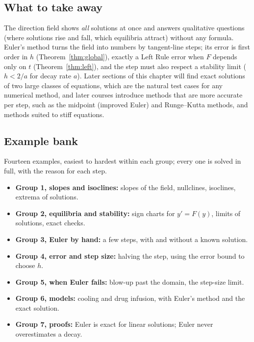 \documentclass[11pt]{article}
\begin{document}
\subsection*{What to take away}

The direction field shows \emph{all} solutions at once and answers qualitative questions (where solutions rise and fall, which equilibria attract) without any formula. Euler's method turns the field into numbers by tangent-line steps; its error is first order in $h$ (Theorem~\ref{thm:global}), exactly a Left Rule error when $F$ depends only on $t$ (Theorem~\ref{thm:left}), and the step must also respect a stability limit ($h<2/a$ for decay rate $a$). Later sections of this chapter will find exact solutions of two large classes of equations, which are the natural test cases for any numerical method, and later courses introduce methods that are more accurate per step, such as the midpoint (improved Euler) and Runge--Kutta methods, and methods suited to stiff equations.

\subsection*{Example bank}

\begin{remark}
Fourteen examples, easiest to hardest within each group; every one is solved in full, with the reason for each step.
\begin{itemize}[nosep]
  \item \textbf{Group 1, slopes and isoclines:} slopes of the field, nullclines, isoclines, extrema of solutions.
  \item \textbf{Group 2, equilibria and stability:} sign charts for $y'=F(y)$, limits of solutions, exact checks.
  \item \textbf{Group 3, Euler by hand:} a few steps, with and without a known solution.
  \item \textbf{Group 4, error and step size:} halving the step, using the error bound to choose $h$.
  \item \textbf{Group 5, when Euler fails:} blow-up past the domain, the step-size limit.
  \item \textbf{Group 6, models:} cooling and drug infusion, with Euler's method and the exact solution.
  \item \textbf{Group 7, proofs:} Euler is exact for linear solutions; Euler never overestimates a decay.
\end{itemize}
\end{remark}
\end{document}
